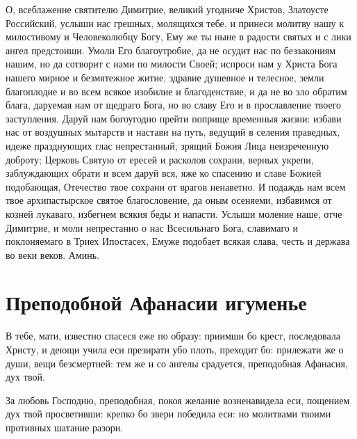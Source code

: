 О, всеблаженне святителю Димитрие, великий угодниче Христов, Златоусте Российский, услыши нас грешных, молящихся тебе, и принеси молитву нашу к милостивому и Человеколюбцу Богу, Ему же ты ныне в радости святых и с лики ангел предстоиши. Умоли Его благоутробие, да не осудит нас по беззакониям нашим, но да сотворит с нами по милости Своей; испроси нам у Христа Бога нашего мирное и безмятежное житие, здравие душевное и телесное, земли благоплодие и во всем всякое изобилие и благоденствие, и да не во зло обратим блага, даруемая нам от щедраго Бога, но во славу Его и в прославление твоего заступления. Даруй нам богоугодно прейти поприще временныя жизни: избави нас от воздушных мытарств и настави на путь, ведущий в селения праведных, идеже празднующих глас непрестанный, зрящий Божия Лица неизреченную доброту; Церковь Святую от ересей и расколов сохрани, верных укрепи, заблуждающих обрати и всем даруй вся, яже ко спасению и славе Божией подобающая, Отечество твое сохрани от врагов ненаветно. И подаждь нам всем твое архипастырское святое благословение, да оным осеняеми, избавимся от козней лукаваго, избегнем всякия беды и напасти. Услыши моление наше, отче Димитрие, и моли непрестанно о нас Всесильнаго Бога, славимаго и поклоняемаго в Триех Ипостасех, Емуже подобает всякая слава, честь и держава во веки веков. Аминь.
\mychapterending


 

\section{Преподобной Афанасии игуменье}
 



 В тебе, мати, известно спасеся еже по образу: приимши бо крест, последовала Христу, и деющи учила еси презирати убо плоть, преходит бо: прилежати же о души, вещи безсмертней: тем же и со ангелы срадуется, преподобная Афанасия, дух твой.



 За любовь Господню, преподобная, покоя желание возненавидела еси, пощением дух твой просветивши: крепко бо звери победила еси: но молитвами твоими противных шатание разори.
\mychapterending


